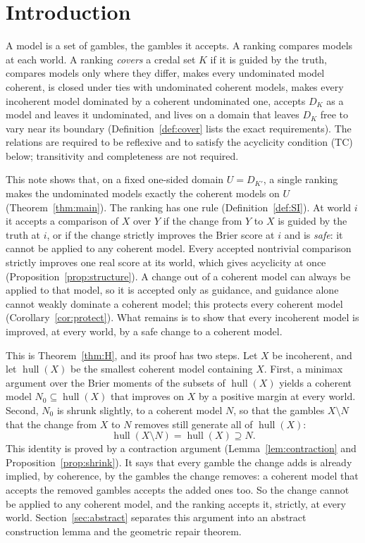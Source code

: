 \documentclass[11pt]{article}
\newcommand{\hull}{\operatorname{hull}}
\theoremstyle{plain}
\theoremstyle{definition}
\theoremstyle{remark}
\begin{document}
\section{Introduction}\label{sec:intro}

A model is a set of gambles, the gambles it accepts. A ranking compares models at each
world. A ranking \emph{covers} a credal set $K$ if it is guided by the truth, compares
models only where they differ, makes every undominated model coherent, is closed under
ties with undominated coherent models, makes every incoherent model dominated by a coherent
undominated one, accepts $D_K$ as a model and leaves it undominated, and lives on a domain
that leaves $D_K$ free to vary near its boundary (Definition~\ref{def:cover} lists the
exact requirements). The relations are required to be reflexive and to satisfy
the acyclicity condition (TC) below; transitivity and completeness are not required.

This note shows that, on a fixed one-sided domain $U=D_{K'}$, a single ranking makes the
undominated models exactly the coherent models on $U$ (Theorem~\ref{thm:main}). The
ranking has one rule (Definition~\ref{def:SI}). At world $i$ it accepts a comparison of
$X$ over $Y$ if the change from $Y$ to $X$ is guided by the truth at $i$, or if the change
strictly improves the Brier score at $i$ and is \emph{safe}: it cannot be applied to any
coherent model. Every accepted nontrivial comparison strictly improves one real score at
its world, which gives acyclicity at once (Proposition~\ref{prop:structure}). A change out
of a coherent model can always be applied to that model, so it is accepted only as
guidance, and guidance alone cannot weakly dominate a coherent model; this protects every
coherent model (Corollary~\ref{cor:protect}). What remains is to show that every
incoherent model is improved, at every world, by a safe change to a coherent model.

This is Theorem~\ref{thm:H}, and its proof has two steps. Let $X$ be incoherent, and let
$\hull(X)$ be the smallest coherent model containing $X$. First, a minimax argument over
the Brier moments of the subsets of $\hull(X)$ yields a coherent model $N_0\subseteq
\hull(X)$ that improves on $X$ by a positive margin at every world. Second, $N_0$ is
shrunk slightly, to a coherent model $N$, so that the gambles $X\setminus N$ that the
change from $X$ to $N$ removes still generate all of $\hull(X)$:
\[
  \hull(X\setminus N)=\hull(X)\supseteq N .
\]
This identity is proved by a contraction argument (Lemma~\ref{lem:contraction} and
Proposition~\ref{prop:shrink}). It says that every gamble the change adds is already
implied, by coherence, by the gambles the change removes: a coherent model that accepts
the removed gambles accepts the added ones too. So the change cannot be applied to any
coherent model, and the ranking accepts it, strictly, at every world.
Section~\ref{sec:abstract} separates this argument into an abstract construction lemma and
the geometric repair theorem.
\end{document}
